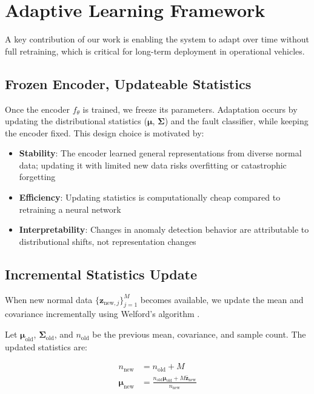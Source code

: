 \section{Adaptive Learning Framework}

A key contribution of our work is enabling the system to adapt over time without full retraining, which is critical for long-term deployment in operational vehicles.

\subsection{Frozen Encoder, Updateable Statistics}

Once the encoder $f_\theta$ is trained, we freeze its parameters. Adaptation occurs by updating the distributional statistics ($\boldsymbol{\mu}$, $\boldsymbol{\Sigma}$) and the fault classifier, while keeping the encoder fixed. This design choice is motivated by:

\begin{itemize}
    \item \textbf{Stability}: The encoder learned general representations from diverse normal data; updating it with limited new data risks overfitting or catastrophic forgetting
    \item \textbf{Efficiency}: Updating statistics is computationally cheap compared to retraining a neural network
    \item \textbf{Interpretability}: Changes in anomaly detection behavior are attributable to distributional shifts, not representation changes
\end{itemize}

\subsection{Incremental Statistics Update}

When new normal data $\{\mathbf{z}_{\text{new},j}\}_{j=1}^{M}$ becomes available, we update the mean and covariance incrementally using Welford's algorithm \parencite{welford1962note}.

Let $\boldsymbol{\mu}_{\text{old}}$, $\boldsymbol{\Sigma}_{\text{old}}$, and $n_{\text{old}}$ be the previous mean, covariance, and sample count. The updated statistics are:

\begin{align}
n_{\text{new}} &= n_{\text{old}} + M \\
\boldsymbol{\mu}_{\text{new}} &= \frac{n_{\text{old}} \boldsymbol{\mu}_{\text{old}} + M \bar{\mathbf{z}}_{\text{new}}}{n_{\text{new}}}
\end{align}

